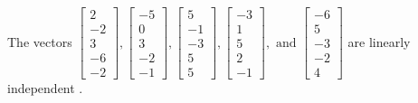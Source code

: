 \begin{exercise}
\begin{exerciseStatement}
  \end{exerciseStatement}
  \begin{exerciseAnswer}
   The vectors \(\left[\begin{array}{r}
2 \\
-2 \\
3 \\
-6 \\
-2
\end{array}\right] , \left[\begin{array}{r}
-5 \\
0 \\
3 \\
-2 \\
-1
\end{array}\right] , \left[\begin{array}{r}
5 \\
-1 \\
-3 \\
5 \\
5
\end{array}\right] , \left[\begin{array}{r}
-3 \\
1 \\
5 \\
2 \\
-1
\end{array}\right] , \text{ and } \left[\begin{array}{r}
-6 \\
5 \\
-3 \\
-2 \\
4
\end{array}\right]\) are 
  	 linearly independent  .
  


  \end{exerciseAnswer}
\end{exercise}